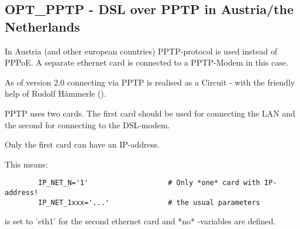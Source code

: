 \subsection {OPT\_PPTP - DSL over PPTP in Austria/the Netherlands}

In Austria (and other european countries) PPTP-protocol is used 
instead of PPPoE. A separate ethernet card is connected to a PPTP-Modem 
in this case.

As of version 2.0 connecting via PPTP is realised as a Circuit - with 
the friendly help of Rudolf Hämmerle
().

PPTP uses two cards. The first card should be used for connecting the 
LAN and the second for connecting to the DSL-modem.

Only the first card can have an IP-address.

This means:

\begin{example}
\begin{verbatim}
        IP_NET_N='1'                   # Only *one* card with IP-address!
        IP_NET_1xxx='...'              # the usual parameters
\end{verbatim}
\end{example}

 is set to 'eth1' for the second ethernet card and
*no* -variables are defined.

